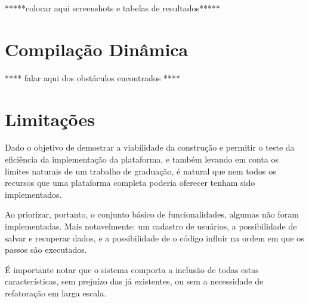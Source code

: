 \documentclass{abnt}
\begin{document}
*****colocar aqui screenshots e tabelas de resultados*****

\section{Compilação Dinâmica}

**** falar aqui dos obstáculos encontrados ****






\section {Limitações}

Dado o objetivo de demostrar a viabilidade da construção e permitir o teste da eficiência da implementação da plataforma, e também levando em conta os limites naturais de um trabalho de graduação, é natural que nem todos os recursos que uma plataforma completa poderia oferecer tenham sido implementados.

Ao priorizar, portanto, o conjunto básico de funcionalidades, algumas não foram implementadas. Mais notavelmente: um cadastro de usuários, a possibilidade de salvar e recuperar dados, e a possibilidade de o código influir na ordem em que os passos são executados.

É importante notar que o sistema comporta a inclusão de todas estas características, sem prejuízo das já existentes, ou sem a necessidade de refatoração em larga escala.
\end{document}
